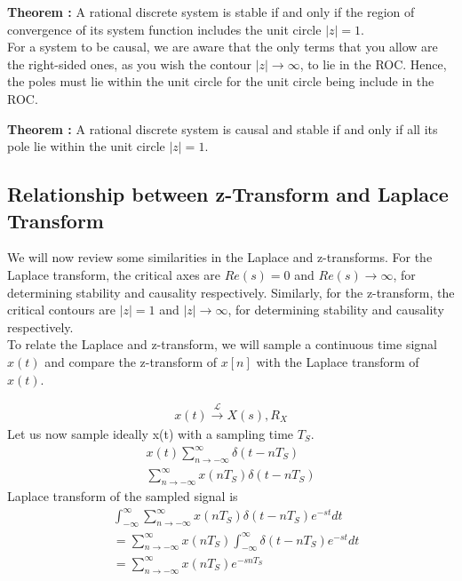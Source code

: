 \textbf{Theorem : } A rational discrete system is stable if and only if the region of convergence of its system function includes the unit circle $|z| = 1$.\\

For a system to be causal, we are aware that the only terms that you allow are the right-sided ones, as you wish the contour $|z| \rightarrow \infty$, to lie in the ROC. Hence, the poles must lie within the unit circle for the unit circle being include in the ROC.

\textbf{Theorem : } A rational discrete system is causal and stable if and only if all its pole lie within the unit circle $|z| = 1$.\\

\subsection{Relationship between z-Transform and Laplace Transform}
We will now review some similarities in the Laplace and z-transforms. For the Laplace transform, the critical axes are $Re(s) = 0$ and $Re(s) \rightarrow \infty$, for determining stability and causality respectively. Similarly, for the z-transform, the critical contours are $|z| = 1$ and $|z| \rightarrow \infty$, for determining stability and causality respectively. \\

To relate the Laplace and z-transform, we will sample a continuous time signal $x(t)$  and compare the z-transform of $x[n]$ with the Laplace transform of $x(t)$.

\begin{align*}
x(t) \xrightarrow{\mathcal{L}} X(s), R_X
\end{align*}
Let us now sample ideally x(t) with a sampling time  $T_S$.
\begin{align*}
x(t)\sum_{n \rightarrow -\infty}^{\infty}{\delta(t - nT_S)}\\
\sum_{n \rightarrow -\infty}^{\infty}{x(nT_S)\delta(t - nT_S)}
\end{align*}
Laplace transform of the sampled signal is
\begin{align*}
&\int_{-\infty}^{\infty}{
\sum_{n \rightarrow -\infty}^{\infty}{x(nT_S)\delta(t - nT_S)}e^{-st}dt}\\
&=\sum_{n \rightarrow -\infty}^{\infty}{x(nT_S)\int_{-\infty}^{\infty}{\delta(t - nT_S)e^{-st}dt}}\\
&=\sum_{n \rightarrow -\infty}^{\infty}{x(nT_S)e^{-snT_S}}
\end{align*}

